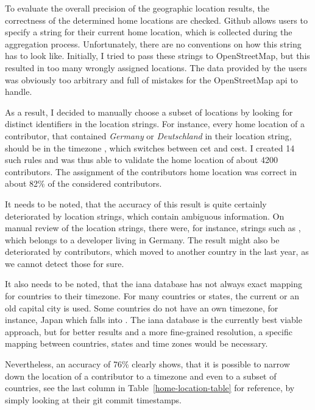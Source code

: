 To evaluate the overall precision of the geographic location results, the correctness of the determined home locations are checked.
Github allows users to specify a string for their current home location, which is collected during the aggregation process.
Unfortunately, there are no conventions on how this string has to look like.
Initially, I tried to pass these strings to OpenStreetMap, but this resulted in too many wrongly assigned locations.
The data provided by the users was obviously too arbitrary and full of mistakes for the OpenStreetMap \ac{api} to handle.

As a result, I decided to manually choose a subset of locations by looking for distinct identifiers in the location strings.
For instance, every home location of a contributor, that contained \emph{Germany} or \emph{Deutschland} in their location string, should be in the timezone , which switches between \ac{cet} and \ac{cest}.
I created 14 such rules and was thus able to validate the home location of about 4200 contributors.
The assignment of the contributors home location was correct in about 82\% of the considered contributors.

It needs to be noted, that the accuracy of this result is quite certainly deteriorated by location strings, which contain ambiguous information.
On manual review of the location strings, there were, for instance, strings such as , which belongs to a developer living in Germany.
The result might also be deteriorated by contributors, which moved to another country in the last year, as we cannot detect those for sure.

It also needs to be noted, that the \ac{iana} database has not always exact mapping for countries to their timezone.
For many countries or states, the current or an old capital city is used.
Some countries do not have an own timezone, for instance, Japan which falls into .
The \ac{iana} database is the currently best viable approach, but for better results and a more fine-grained resolution, a specific mapping between countries, states and time zones would be necessary.

Nevertheless, an accuracy of 76\% clearly shows, that it is possible to narrow down the location of a contributor to a timezone and even to a subset of countries, see the last column in Table~\ref{home-location-table} for reference, by simply looking at their git commit timestamps.

